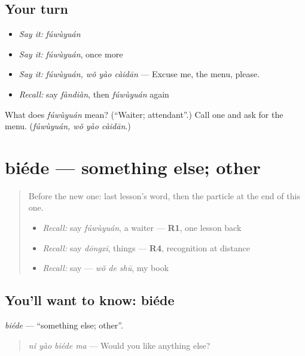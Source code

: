 \subsection*{Your turn}
\begin{itemize}
\raggedright
  \item \emph{Say it:} \emph{fúwùyuán}
  \item \emph{Say it:} \emph{fúwùyuán}, once more
  \item \emph{Say it:} \emph{fúwùyuán, wǒ yào càidān} — Excuse me, the menu, please.
  \item \emph{Recall:} say \emph{fàndiàn}, then \emph{fúwùyuán} again
\end{itemize}

\begin{tcolorbox}[breakable,colback=teal!4,colframe=teal!35!black,title={Before you move on}]
What does \emph{fúwùyuán} mean? (\textquotedblleft{}Waiter; attendant\textquotedblright{}.) Call one and ask for the menu. (\emph{fúwùyuán, wǒ yào càidān}.)
\end{tcolorbox}
\section[biéde]{biéde — something else; other}

\label{lesson:ZH-C92-biede}



\begin{quote}
Before the new one: last lesson's word, then the particle at the end of this one.

\begin{itemize}
\raggedright
  \item \emph{Recall:} say \emph{fúwùyuán}, a waiter — \textbf{R1}, one lesson back
  \item \emph{Recall:} say \emph{dōngxi}, things — \textbf{R4}, recognition at distance
  \item \emph{Recall:} say  — \emph{wǒ de shū}, my book
\end{itemize}
\end{quote}

\subsection*{You'll want to know: biéde}
\emph{biéde} — \textquotedblleft{}something else; other\textquotedblright{}.

\begin{quote}
\emph{nǐ yào biéde ma} — Would you like anything else?
\end{quote}

